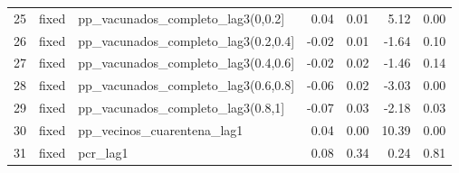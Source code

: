 \begin{table}[ht]
\begin{tabular}{rllrrrr}
  25 & fixed & pp\_vacunados\_completo\_lag3(0,0.2] & 0.04 & 0.01 & 5.12 & 0.00 \\ 
  26 & fixed & pp\_vacunados\_completo\_lag3(0.2,0.4] & -0.02 & 0.01 & -1.64 & 0.10 \\ 
  27 & fixed & pp\_vacunados\_completo\_lag3(0.4,0.6] & -0.02 & 0.02 & -1.46 & 0.14 \\ 
  28 & fixed & pp\_vacunados\_completo\_lag3(0.6,0.8] & -0.06 & 0.02 & -3.03 & 0.00 \\ 
  29 & fixed & pp\_vacunados\_completo\_lag3(0.8,1] & -0.07 & 0.03 & -2.18 & 0.03 \\ 
  30 & fixed & pp\_vecinos\_cuarentena\_lag1 & 0.04 & 0.00 & 10.39 & 0.00 \\ 
  31 & fixed & pcr\_lag1 & 0.08 & 0.34 & 0.24 & 0.81 \\ 
   \hline
\end{tabular}
\end{table}
